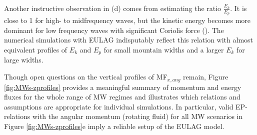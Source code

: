 Another instructive observation in (d) comes from estimating the ratio $\frac{E_k}{E_p}$. It is close to 1 for high- to midfrequency waves, but the kinetic energy becomes more dominant for low frequency waves with significant Coriolis force (\cite[]{gill_atmosphere-ocean_1982}). The numerical simulations with EULAG indisputably reflect this relation with almost equivalent profiles of $E_k$ and $E_p$ for small mountain widths and a larger $E_k$ for large widths.

Though open questions on the vertical profiles of MF$_{x,ang}$ remain, Figure \ref{fig:MWs-zprofiles} provides a meaningful summary of momentum and energy fluxes for the whole range of MW regimes and illustrates which relations and assumptions are appropriate for individual simulations. In particular, valid EP-relations with the angular momentum (rotating fluid) for all MW scenarios in Figure \ref{fig:MWs-zprofiles}e imply a reliable setup of the EULAG model.






